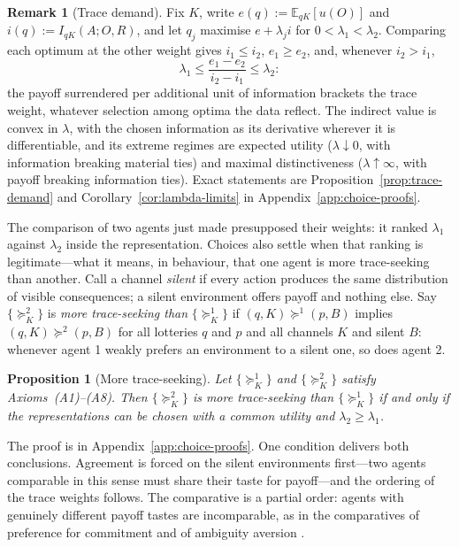 \documentclass[11pt,a4paper]{article}
\newtheorem{proposition}[theorem]{Proposition}
\theoremstyle{definition}
\newtheorem{remark}[theorem]{Remark}
\newcommand{\E}{\mathbb E}
\newcommand{\I}{I}
\newcommand{\1}{\mathbf 1}
\begin{document}
\begin{remark}[Trace demand]\label{rem:trace-demand}
Fix $K$, write $e(q):=\E_{qK}[u(O)]$ and $i(q):=\I_{qK}(A;O,R)$, and let $q_j$ maximise $e+\lambda_ji$ for
$0<\lambda_1<\lambda_2$.  Comparing each optimum at the other weight gives $i_1\le i_2$, $e_1\ge e_2$, and,
whenever $i_2>i_1$,
\[
 \lambda_1\le\frac{e_1-e_2}{i_2-i_1}\le\lambda_2:
\]
the payoff surrendered per additional unit of information brackets the trace weight, whatever selection among
optima the data reflect.  The indirect value is convex in $\lambda$, with the chosen information as its derivative
wherever it is differentiable, and its extreme regimes are expected utility ($\lambda\downarrow0$, with information
breaking material ties) and maximal distinctiveness ($\lambda\uparrow\infty$, with payoff breaking information
ties).  Exact statements are Proposition~\ref{prop:trace-demand} and Corollary~\ref{cor:lambda-limits} in
Appendix~\ref{app:choice-proofs}.
\end{remark}

The comparison of two agents just made presupposed their weights: it ranked $\lambda_1$ against $\lambda_2$
inside the representation.  Choices also settle when that ranking is legitimate---what it means, in behaviour,
that one agent is more trace-seeking than another.  Call a channel \emph{silent} if every action produces the
same distribution of visible consequences; a silent environment offers payoff and nothing else.  Say
$\{\succeq^2_K\}$ is \emph{more trace-seeking than} $\{\succeq^1_K\}$ if $(q,K)\succeq^1(p,B)$ implies
$(q,K)\succeq^2(p,B)$ for all lotteries $q$ and $p$ and all channels $K$ and silent $B$: whenever agent 1
weakly prefers an environment to a silent one, so does agent 2.

\begin{proposition}[More trace-seeking]\label{prop:comparative}
Let $\{\succeq^1_K\}$ and $\{\succeq^2_K\}$ satisfy Axioms~\textup{(A1)--(A8)}.  Then $\{\succeq^2_K\}$ is more
trace-seeking than $\{\succeq^1_K\}$ if and only if the representations can be chosen with a common utility and
$\lambda_2\ge\lambda_1$.
\end{proposition}

The proof is in Appendix~\ref{app:choice-proofs}.  One condition delivers both conclusions.  Agreement is
forced on the silent environments first---two agents comparable in this sense must share their taste for
payoff---and the ordering of the trace weights follows.  The comparative is a partial order: agents with
genuinely different payoff tastes are incomparable, as in the comparatives of preference for commitment and of
ambiguity aversion \cite{GulPesendorfer2001,GhirardatoMarinacci2002}.
\end{document}
